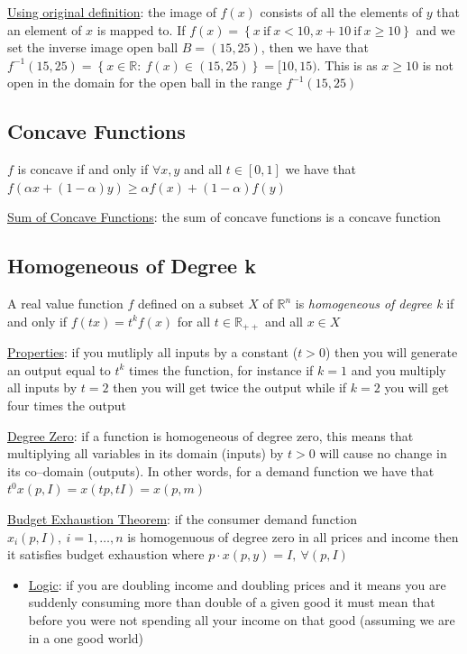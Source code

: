 \documentclass{article}
\begin{document}
  \par
  \underline{Using original definition}: the image of $f(x)$ consists of all the elements of $y$ that an element of $x$ is mapped to. If $f(x) = \left\{x \ \text{if} \ x < 10, x + 10 \ \text{if} \ x \geq 10 \right\}$ and we set the inverse image open ball $B = (15, 25)$, then  we have that $f^{-1}(15,25) = \left\{ x \in \mathbb{R}: \ f(x) \in (15, 25) \right\} = [10, 15)$. This is as $x \geq 10$ is not open in the domain for the open ball in the range $f^{-1}(15,25)$
  \par
\vspace{6mm}
\subsection{Concave Functions}
$f$ is concave if and only if $\forall x,y$ and all $t \in [0,1]$ we have that $f(\alpha x + (1-\alpha)y) \geq \alpha f(x) + (1-\alpha)f(y) $\par \vspace{0.3em}
  \underline{Sum of Concave Functions}: the sum of concave functions is a concave function
\subsection{Homogeneous of Degree k}
A real value function $f$ defined on a subset $X$ of $\mathbb{R}^{n}$ is \textit{homogeneous of degree k} if and only if $f(tx) = t^{k}f(x)$ for all $t \in \mathbb{R}_{++}$ and all $x \in X$ \par \vspace{0.3em}
  \underline{Properties}: if you mutliply all inputs by a constant ($t > 0$) then you will generate an output equal to $t^{k}$ times the function, for instance if $k=1$ and you multiply all inputs by $t=2$ then you will get twice the output while if $k = 2$ you will get four times the output
  \par
  \underline{Degree Zero}: if a function is homogeneous of degree zero, this means that multiplying all variables in its domain (inputs) by $t > 0$ will cause no change in its co--domain (outputs). In other words, for a demand function we have that $t^{0}x(p, I) = x(tp, tI) = x(p,m)$
  \par
  \underline{Budget Exhaustion Theorem}: if the consumer demand function $x_{i}(p,I), \ i = 1, \dots, n$ is homogenuous of degree zero in all prices and income then it satisfies budget exhaustion where $p \cdot x(p,y) = I, \ \forall (p,I)$
  \begin{itemize}
    \item  \underline{Logic}: if you are doubling income and doubling prices and it means you are suddenly consuming more than double of a given good it must mean that before you were not spending all your income on that good (assuming we are in a one good world)
  \end{itemize}
\end{document}
